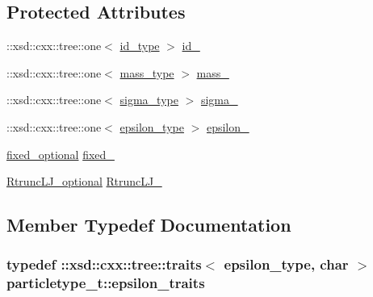 \subsection*{Protected Attributes}
\begin{DoxyCompactItemize}
\item 
\+::xsd\+::cxx\+::tree\+::one$<$ \hyperlink{classparticletype__t_af4592f0136ed3224434007bc7f5c7fd4}{id\+\_\+type} $>$ \hyperlink{classparticletype__t_a14b4df24e40439bf766545034eb33256}{id\+\_\+}
\item 
\+::xsd\+::cxx\+::tree\+::one$<$ \hyperlink{classparticletype__t_a7ebd18e57b545977bf3d1573ffa395f7}{mass\+\_\+type} $>$ \hyperlink{classparticletype__t_a833425b7549845017f4f53201e261c76}{mass\+\_\+}
\item 
\+::xsd\+::cxx\+::tree\+::one$<$ \hyperlink{classparticletype__t_abbac1ed447872eb2db5cc90f2c1e1a6c}{sigma\+\_\+type} $>$ \hyperlink{classparticletype__t_a1d31f582a032e178f3e0832a7202fa68}{sigma\+\_\+}
\item 
\+::xsd\+::cxx\+::tree\+::one$<$ \hyperlink{classparticletype__t_a94692265645066b820b0e4c308c1566f}{epsilon\+\_\+type} $>$ \hyperlink{classparticletype__t_a2ab316a2ae4738c32883b046924c5aea}{epsilon\+\_\+}
\item 
\hyperlink{classparticletype__t_a42eca3b383084472937b0ad4f370bbb2}{fixed\+\_\+optional} \hyperlink{classparticletype__t_a81af477c09b255cac4d1fd909a7541dd}{fixed\+\_\+}
\item 
\hyperlink{classparticletype__t_aa09967796541d58a44dfec6bcbb2c431}{Rtrunc\+L\+J\+\_\+optional} \hyperlink{classparticletype__t_ae0011fe9477c7239e4e270378ea1ddbc}{Rtrunc\+L\+J\+\_\+}
\end{DoxyCompactItemize}


\subsection{Member Typedef Documentation}
\subsubsection[{\texorpdfstring{epsilon\+\_\+traits}{epsilon_traits}}]{\setlength{\rightskip}{0pt plus 5cm}typedef \+::xsd\+::cxx\+::tree\+::traits$<$ {\bf epsilon\+\_\+type}, char $>$ {\bf particletype\+\_\+t\+::epsilon\+\_\+traits}}\hypertarget{classparticletype__t_aba72bd9fc1660ca66d7294ea79e6a32e}{}\label{classparticletype__t_aba72bd9fc1660ca66d7294ea79e6a32e}
